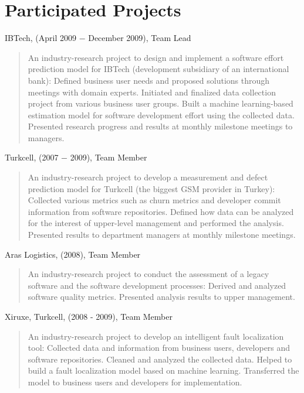\documentclass[margin]{res}
\begin{document}
\begin{resume}
\begin{list}{}{\leftmargin=0.5em}
\end{list}


\section{Participated Projects} 

\begin{list}{}{\leftmargin=0.5em}

\item IBTech, (April 2009 $-$ December 2009), Team Lead
\begin{quote}
An industry-research project to design and implement a software effort prediction model for IBTech (development subsidiary of an international bank):
Defined business user needs and proposed solutions through meetings with domain experts.
Initiated and finalized data collection project from various business user groups.
Built a machine learning-based estimation model for software development effort using the collected data.
Presented research progress and results at monthly milestone meetings to managers.
\end{quote}

\item Turkcell, (2007 $-$ 2009), Team Member
\begin{quote}
An industry-research project to develop a measurement and defect prediction model for Turkcell (the biggest GSM provider in Turkey): Collected various metrics such as churn metrics and developer commit information from software repositories. Defined how data can be analyzed for the interest of upper-level management and performed the analysis. Presented results to department managers at monthly milestone meetings.
\end{quote}

\item Aras  Logistics, (2008), Team Member
\begin{quote}
An industry-research project to conduct the assessment of a legacy software and the software development processes: Derived and analyzed software quality metrics. Presented analysis results to upper management.
\end{quote}

\item Xiruxe, Turkcell, (2008 - 2009), Team Member
\begin{quote}
An industry-research project to develop an intelligent fault localization tool: 
Collected data and information from business users, developers and software repositories.
Cleaned and analyzed the collected data. Helped to build a fault localization model based on machine learning. Transferred the model to business users and developers for implementation.
\end{quote}


\end{list}
\end{resume}
\end{document}
